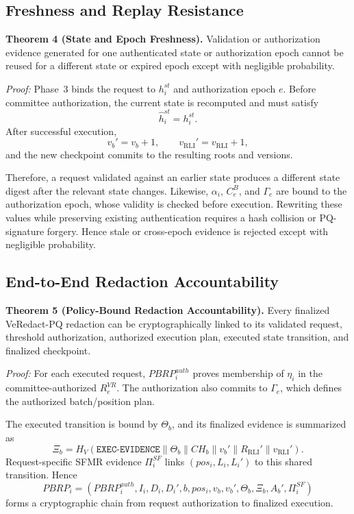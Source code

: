 \documentclass[lettersize,journal]{IEEEtran}
\begin{document}
\subsection{Freshness and Replay Resistance}

\textbf{Theorem 4 (State and Epoch Freshness).}
Validation or authorization evidence generated for one authenticated
state or authorization epoch cannot be reused for a different state or
expired epoch except with negligible probability.

\emph{Proof:}
Phase~3 binds the request to $h_i^{st}$ and authorization epoch $e$.
Before committee authorization, the current state is recomputed and
must satisfy
\begin{equation}
\widehat h_i^{st}=h_i^{st}.
\end{equation}
After successful execution,
\begin{equation}
v_b'=v_b+1,
\qquad
v_{\mathrm{RLI}}'=v_{\mathrm{RLI}}+1,
\end{equation}
and the new checkpoint commits to the resulting roots and versions.

Therefore, a request validated against an earlier state produces a
different state digest after the relevant state changes. Likewise,
$\alpha_i$, $C_e^B$, and $\Gamma_e$ are bound to the authorization
epoch, whose validity is checked before execution. Rewriting these
values while preserving existing authentication requires a hash
collision or PQ-signature forgery. Hence stale or cross-epoch evidence
is rejected except with negligible probability.

\subsection{End-to-End Redaction Accountability}

\textbf{Theorem 5 (Policy-Bound Redaction Accountability).}
Every finalized VeRedact-PQ redaction can be cryptographically linked
to its validated request, threshold authorization, authorized execution
plan, executed state transition, and finalized checkpoint.

\emph{Proof:}
For each executed request, $PBRP_i^{auth}$ proves membership of
$\eta_i$ in the committee-authorized $R_e^{VR}$. The authorization
also commits to $\Gamma_e$, which defines the authorized batch/position
plan.

The executed transition is bound by $\Theta_b$, and its finalized
evidence is summarized as
\begin{equation}
\Xi_b=
H_V(\texttt{EXEC-EVIDENCE}\parallel
\Theta_b\parallel CH_b\parallel v_b'
\parallel R_{\mathrm{RLI}}'\parallel v_{\mathrm{RLI}}').
\end{equation}
Request-specific SFMR evidence $\Pi_i^{SF}$ links
$(pos_i,L_i,L_i')$ to this shared transition. Hence
\begin{equation}
PBRP_i=
(PBRP_i^{auth},I_i,D_i,D_i',b,pos_i,
v_b,v_b',\Theta_b,\Xi_b,A_b',\Pi_i^{SF})
\end{equation}
forms a cryptographic chain from request authorization to finalized
execution.
\end{document}

